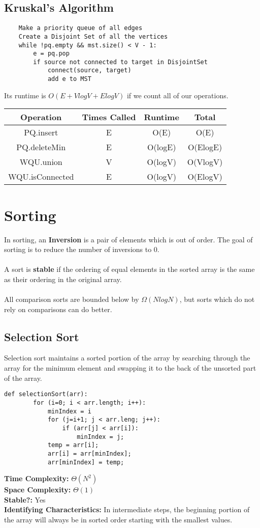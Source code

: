 \documentclass{article}
\begin{document}
\subsection{Kruskal's Algorithm}
\begin{lstlisting}
    Make a priority queue of all edges
    Create a Disjoint Set of all the vertices
    while !pq.empty && mst.size() < V - 1:
        e = pq.pop
        if source not connected to target in DisjointSet
            connect(source, target)
            add e to MST
\end{lstlisting}
Its runtime is $O(E + VlogV+ElogV)$ if we count all of our operations.
\begin{center}
    \begin{tabular}{| c | c | c | c |}
        \hline
        Operation & Times Called & Runtime & Total\\
        \hline
        PQ.insert & E & O(E) & O(E)\\
        \hline
        PQ.deleteMin & E & O(logE) & O(ElogE)\\
        \hline
        WQU.union & V & O(logV) & O(VlogV)\\
        \hline
        WQU.isConnected & E & O(logV) & O(ElogV)\\
        \hline
    \end{tabular}
\end{center}
\section{Sorting}
In sorting, an \textbf{Inversion} is a pair of elements which is out of order.
The goal of sorting is to reduce the number of inversions to 0.\\\\
A sort is \textbf{stable} if the ordering of equal elements in the sorted array is the same as their ordering in the original array.
\\\\
All comparison sorts are bounded below by $\Omega(NlogN)$, but sorts which do not rely on comparisons can do better.
\subsection{Selection Sort}
Selection sort maintains a sorted portion of the array by searching through the array for the minimum element and swapping it to the back of the unsorted part of the array.
\begin{lstlisting}[]
    def selectionSort(arr):
        for (i=0; i < arr.length; i++):
            minIndex = i
            for (j=i+1; j < arr.leng; j++):
                if (arr[j] < arr[i]):
                    minIndex = j;
            temp = arr[i];
            arr[i] = arr[minIndex];
            arr[minIndex] = temp;
\end{lstlisting}
\textbf{Time Complexity: } $\Theta(N^2)$\\
\textbf{Space Complexity: } $\Theta(1)$\\
\textbf{Stable?: } Yes\\
\textbf{Identifying Characteristics: } In intermediate steps, the beginning portion of the array will always be in sorted order starting with the smallest values. 
\end{document}
